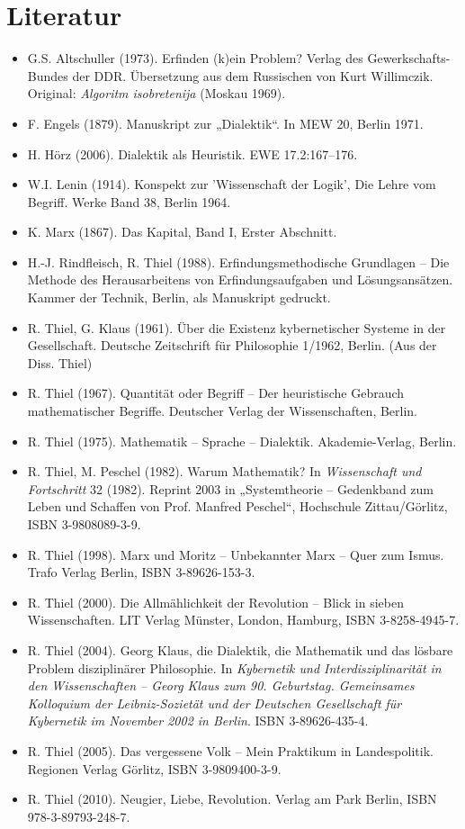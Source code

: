 \documentclass[a4paper,11pt]{article}
\begin{document}
\section*{Literatur}
\begin{itemize}
\item G.S. Altschuller (1973). Erfinden (k)ein Problem?  Verlag des
  Gewerkschafts-Bundes der DDR.  Übersetzung aus dem Russischen von Kurt
  Willimczik. Original: \emph{Algoritm isobretenija} (Moskau 1969).
\item F. Engels (1879). Manuskript zur „Dialektik“. In MEW 20, Berlin
  1971.
\item H. Hörz (2006).  Dialektik als Heuristik. EWE 17.2:167--176.
\item W.I. Lenin (1914). Konspekt zur 'Wissenschaft der Logik', Die Lehre vom
  Begriff. Werke Band 38, Berlin 1964.
\item K. Marx (1867). Das Kapital, Band I, Erster Abschnitt.
\item H.-J. Rindfleisch, R. Thiel (1988). Erfindungsmethodische Grundlagen –
  Die Methode des Herausarbeitens von Erfindungsaufgaben und Lösungsansätzen.
  Kammer der Technik, Berlin, als Manuskript gedruckt.
\item R. Thiel, G. Klaus (1961). Über die Existenz kybernetischer Systeme in
  der Gesellschaft. Deutsche Zeitschrift für Philosophie 1/1962, Berlin. (Aus
  der Diss. Thiel)
\item R. Thiel (1967). Quantität oder Begriff – Der heuristische Gebrauch
  mathematischer Begriffe. Deutscher Verlag der Wissenschaften, Berlin.
\item R. Thiel (1975). Mathematik – Sprache – Dialektik.  Akademie-Verlag,
  Berlin.
\item R. Thiel, M. Peschel (1982). Warum Mathematik? In \emph{Wissenschaft und
  Fortschritt} 32 (1982). Reprint 2003 in „Systemtheorie -- Gedenkband zum
  Leben und Schaffen von Prof. Manfred Peschel“, Hochschule Zittau/Görlitz,
  ISBN 3-9808089-3-9.
\item R. Thiel (1998). Marx und Moritz – Unbekannter Marx – Quer zum Ismus.
  Trafo Verlag Berlin, ISBN 3-89626-153-3.
\item R. Thiel (2000). Die Allmählichkeit der Revolution – Blick in sieben
  Wissenschaften.  LIT Verlag Münster, London, Hamburg, ISBN 3-8258-4945-7.
\item R. Thiel (2004). Georg Klaus, die Dialektik, die Mathematik und das
  lösbare Problem disziplinärer Philosophie. In \emph{Kybernetik und
    Interdisziplinarität in den Wissenschaften – Georg Klaus zum
    90. Geburtstag. Gemeinsames Kolloquium der Leibniz-Sozietät und der
    Deutschen Gesellschaft für Kybernetik im November 2002 in Berlin}.  ISBN
  3-89626-435-4.
\item R. Thiel (2005). Das vergessene Volk – Mein Praktikum in Landespolitik.
  Regionen Verlag Görlitz, ISBN 3-9809400-3-9.
\item R. Thiel (2010). Neugier, Liebe, Revolution.  Verlag am Park Berlin,
  ISBN 978-3-89793-248-7.
\end{itemize}
\ccnotice
\end{document}
